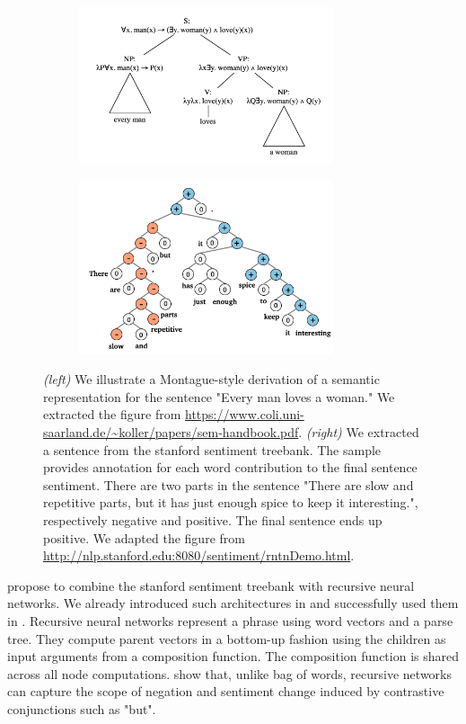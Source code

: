 \begin{figure}[htb!]
    \centering
    \begin{subfigure}[b]{8cm}
        \centering
        \includegraphics[width=7.5cm]{images/lambda_form.png}
    \end{subfigure}
    \hfill
    \begin{subfigure}[b]{8cm}  
        \centering 
        \includegraphics[width=7.5cm]{images/socher-tree-5.png}
\end{subfigure}
\caption{\textit{(left)} We illustrate a Montague-style \parencite{montague_1973} derivation of a semantic representation for the sentence "Every man loves a woman." We extracted the figure from \url{https://www.coli.uni-saarland.de/~koller/papers/sem-handbook.pdf}. \textit{(right)} We extracted a sentence from the stanford sentiment treebank. The sample provides annotation for each word contribution to the final sentence sentiment. There are two parts in the sentence "There are slow and repetitive parts, but it has just enough spice to keep it interesting.", respectively negative and positive. The final sentence ends up positive. We adapted the figure from \url{http://nlp.stanford.edu:8080/sentiment/rntnDemo.html}.}
\end{figure}

\textcite{socher_13} propose to combine the stanford sentiment treebank with recursive neural networks. We already introduced such architectures in  and successfully used them in . Recursive neural networks represent a phrase using word vectors and a parse tree. They compute parent vectors in a bottom-up fashion using the children as input arguments from a composition function. The composition function is shared across all node computations. \textcite{socher_13} show that, unlike bag of words, recursive networks can capture the scope of negation and sentiment change induced by contrastive conjunctions such as "but".

